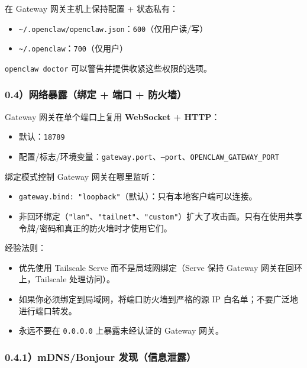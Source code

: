 在 Gateway 网关主机上保持配置 + 状态私有：

\begin{itemize}
  \item \texttt{\textasciitilde{}/.openclaw/openclaw.json}：\texttt{600}（仅用户读/写）
  \item \texttt{\textasciitilde{}/.openclaw}：\texttt{700}（仅用户）
\end{itemize}


\texttt{openclaw doctor} 可以警告并提供收紧这些权限的选项。

\subsubsection{0.4）网络暴露（绑定 + 端口 + 防火墙）}


Gateway 网关在单个端口上复用 \textbf{WebSocket + HTTP}：

\begin{itemize}
  \item 默认：\texttt{18789}
  \item 配置/标志/环境变量：\texttt{gateway.port}、\texttt{--port}、\texttt{OPENCLAW\_GATEWAY\_PORT}
\end{itemize}


绑定模式控制 Gateway 网关在哪里监听：

\begin{itemize}
  \item \texttt{gateway.bind: "loopback"}（默认）：只有本地客户端可以连接。
  \item 非回环绑定（\texttt{"lan"}、\texttt{"tailnet"}、\texttt{"custom"}）扩大了攻击面。只有在使用共享令牌/密码和真正的防火墙时才使用它们。
\end{itemize}


经验法则：

\begin{itemize}
  \item 优先使用 Tailscale Serve 而不是局域网绑定（Serve 保持 Gateway 网关在回环上，Tailscale 处理访问）。
  \item 如果你必须绑定到局域网，将端口防火墙到严格的源 IP 白名单；不要广泛地进行端口转发。
  \item 永远不要在 \texttt{0.0.0.0} 上暴露未经认证的 Gateway 网关。
\end{itemize}


\subsubsection{0.4.1）mDNS/Bonjour 发现（信息泄露）}



